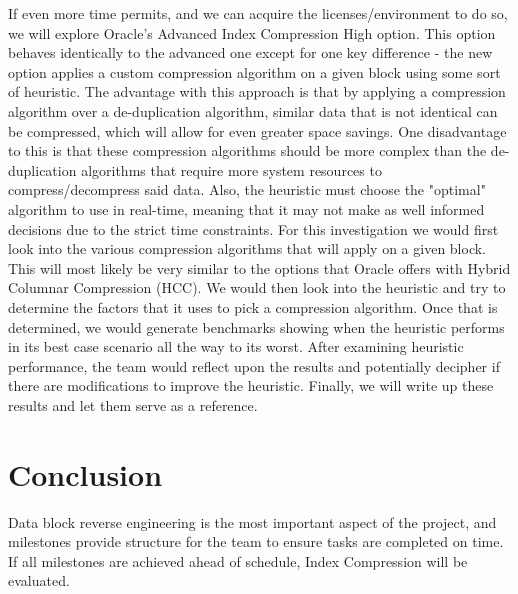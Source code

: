 \documentclass[10pt]{article}
\begin{document}
If even more time permits, and we can acquire the licenses/environment to do so, we will explore Oracle's Advanced Index Compression High option. This option behaves identically to the advanced one except for one key difference - the new option applies a custom compression algorithm on a given block using some sort of heuristic. The advantage with this approach is that by applying a compression algorithm over a de-duplication algorithm, similar data that is not identical can be compressed, which will allow for even greater space savings. One disadvantage to this is that these compression algorithms should be more complex than the de-duplication algorithms that require more system resources to compress/decompress said data. Also, the heuristic must choose the "optimal" algorithm to use in real-time, meaning that it may not make as well informed decisions due to the strict time constraints. For this investigation we would first look into the various compression algorithms that will apply on a given block. This will most likely be very similar to the options that Oracle offers with Hybrid Columnar Compression (HCC). We would then look into the heuristic and try to determine the factors that it uses to pick a compression algorithm. Once that is determined, we would generate benchmarks showing when the heuristic performs in its best case scenario all the way to its worst. After examining heuristic performance, the team would reflect upon the results and potentially decipher if there are modifications to improve the heuristic. Finally, we will write up these results and let them serve as a reference.

\section{Conclusion}
Data block reverse engineering is the most important aspect of the project, and milestones provide structure for the team to ensure tasks are completed on time. If all milestones are achieved ahead of schedule, Index Compression will be evaluated. 
\end{document}
